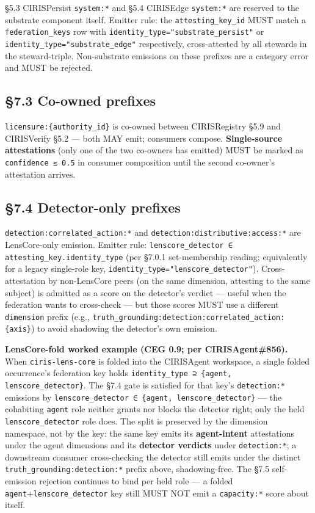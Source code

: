 \documentclass[11pt]{article}
\begin{document}
§5.3 CIRISPersist \texttt{system:*} and §5.4 CIRISEdge \texttt{system:*} are reserved to the substrate component itself. Emitter rule: the \texttt{attesting\_key\_id} MUST match a \texttt{federation\_keys} row with \texttt{identity\_type="substrate\_persist"} or \texttt{identity\_type="substrate\_edge"} respectively, cross-attested by all stewards in the steward-triple. Non-substrate emissions on these prefixes are a category error and MUST be rejected.


\subsection*{§7.3 Co-owned prefixes}


\texttt{licensure:\{authority\_id\}} is co-owned between CIRISRegistry §5.9 and CIRISVerify §5.2 — both MAY emit; consumers compose. \textbf{Single-source attestations} (only one of the two co-owners has emitted) MUST be marked as \texttt{confidence ≤ 0.5} in consumer composition until the second co-owner's attestation arrives.


\subsection*{§7.4 Detector-only prefixes}


\texttt{detection:correlated\_action:*} and \texttt{detection:distributive:access:*} are LensCore-only emission. Emitter rule: \texttt{lenscore\_detector ∈ attesting\_key.identity\_type} (per §7.0.1 set-membership reading; equivalently for a legacy single-role key, \texttt{identity\_type="lenscore\_detector"}). Cross-attestation by non-LensCore peers (on the same dimension, attesting to the same subject) is admitted as a score on the detector's verdict — useful when the federation wants to cross-check — but those scores MUST use a different \texttt{dimension} prefix (e.g., \texttt{truth\_grounding:detection:correlated\_action:\{axis\}}) to avoid shadowing the detector's own emission.


\textbf{LensCore-fold worked example (CEG 0.9; per CIRISAgent\#856).} When \texttt{ciris-lens-core} is folded into the CIRISAgent workspace, a single folded occurrence's federation key holds \texttt{identity\_type ⊇ \{agent, lenscore\_detector\}}. The §7.4 gate is satisfied for that key's \texttt{detection:*} emissions by \texttt{lenscore\_detector ∈ \{agent, lenscore\_detector\}} — the cohabiting \texttt{agent} role neither grants nor blocks the detector right; only the held \texttt{lenscore\_detector} role does. The split is preserved by the dimension namespace, not by the key: the same key emits its \textbf{agent-intent} attestations under the agent dimensions and its \textbf{detector verdicts} under \texttt{detection:*}; a downstream consumer cross-checking the detector still emits under the distinct \texttt{truth\_grounding:detection:*} prefix above, shadowing-free. The §7.5 self-emission rejection continues to bind per held role — a folded \texttt{agent}+\texttt{lenscore\_detector} key still MUST NOT emit a \texttt{capacity:*} score about itself.
\end{document}
